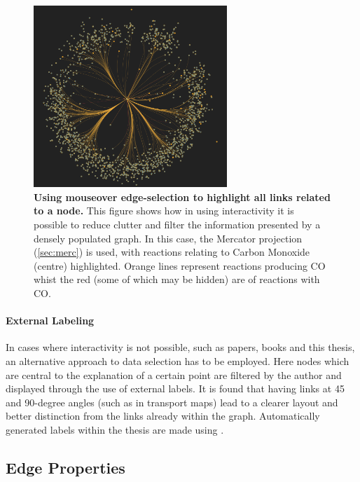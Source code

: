 \begin{figure}[H]
     \centering
     \includegraphics[width=0.65\textwidth]{figures_c1/layout/CObranches.png}
        \caption{\textbf{Using mouseover edge-selection to highlight all links related to a node. } This figure shows how in using interactivity it is possible to reduce clutter and filter the information presented by a densely populated graph. In this case, the Mercator projection (\autoref{sec:merc}) is used, with reactions relating to Carbon Monoxide (centre) highlighted. Orange lines represent reactions producing CO whist the red (some of which may be hidden) are of reactions with CO.  }
      \label{fig:tooltip}
\end{figure}



\paragraph*{\color{c5}External Labeling}
In cases where interactivity is not possible, such as papers, books and this thesis, an alternative approach to data selection has to be employed. Here nodes which are central to the explanation of a certain point are filtered by the author and displayed through the use of external labels. It is found that having links at 45 and 90-degree angles (such as in transport maps) lead to a clearer layout and better distinction from the links already within the graph. Automatically generated labels within the thesis are made using \cite{d3annotate}.







\subsection{Edge Properties}


